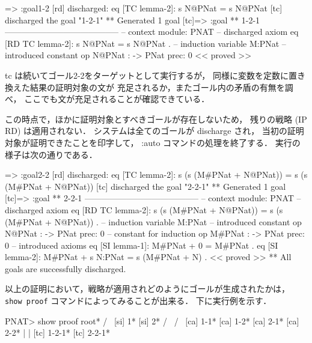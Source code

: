 \documentclass[a4paper,oneside,10pt,here]{memoir}
\newenvironment{vvtm}%
{\parskip=0pt\lineskip=0pt\begin{center}\begin{minipage}{0.8\textwidth}\begin{snugshade}}%
  {\end{snugshade}\end{minipage}\end{center}}
\begin{document}
\begin{vvtm}
\begin{simplev}
[tc]=> :goal{1-2}
[rd] discharged: 
  eq [TC lemma-2]: s N@PNat = s N@PNat
[tc] discharged the goal "1-2-1"
** Generated 1 goal
[tc]=>
:goal { ** 1-2-1 -----------------------------------------
  -- context module: PNAT
  -- discharged axiom
    eq [RD TC lemma-2]: s N@PNat = s N@PNat .
  -- induction variable
    M:PNat
  -- introduced constant
    op N@PNat : -> PNat { prec: 0 }
} << proved >>
\end{simplev}
\end{vvtm}

tc は続いてゴール2-2をターゲットとして実行するが，
同様に変数を定数に置き換えた結果の証明対象の文が
充足されるか，またゴール内の矛盾の有無を調べ，
ここでも文が充足されることが確認できている．

この時点で，ほかに証明対象とすべきゴールが存在しないため，
残りの戦略 (IP RD) は適用されない．
システムは全てのゴールが discharge され，
当初の証明対象が証明できたことを印字して，
:auto コマンドの処理を終了する．
実行の様子は次の通りである．

\begin{vvtm}
\begin{simplev}
[tc]=> :goal{2-2}
[rd] discharged: 
  eq [TC lemma-2]: s (s (M#PNat + N@PNat))
      = s (s (M#PNat + N@PNat))
[tc] discharged the goal "2-2-1"
** Generated 1 goal
[tc]=>
:goal { ** 2-2-1 -----------------------------------------
  -- context module: PNAT
  -- discharged axiom
    eq [RD TC lemma-2]: s (s (M#PNat + N@PNat))
        = s (s (M#PNat + N@PNat)) .
  -- induction variable
    M:PNat
  -- introduced constant
    op N@PNat : -> PNat { prec: 0 }
  -- constant for induction
    op M#PNat : -> PNat { prec: 0 }
  -- introduced axioms
    eq [SI lemma-1]: M#PNat + 0 = M#PNat .
    eq [SI lemma-2]: M#PNat + s N:PNat = s (M#PNat + N) .
} << proved >>
** All goals are successfully discharged.

  \end{simplev}
\end{vvtm}

以上の証明において，戦略が適用されどのようにゴールが生成されたかは，
\verb|show proof| コマンドによってみることが出来る．
下に実行例を示す．

\begin{vvtm}
  \begin{simplev}
PNAT> show proof
                    root*                     
          /                       \            
       [si] 1*                 [si] 2*        
    /           \           /           \      
[ca] 1-1*   [ca] 1-2*   [ca] 2-1*   [ca] 2-2* 
                |                       |      
           [tc] 1-2-1*             [tc] 2-2-1*

  \end{simplev}
\end{vvtm}
\end{document}
